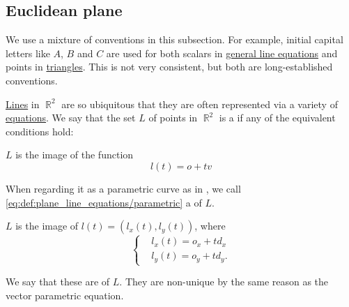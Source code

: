 \subsection{Euclidean plane}\label{subsec:euclidean_plane}

\begin{remark}\label{rem:geometry_mixed_conventions}
  We use a mixture of conventions in this subsection. For example, initial capital letters like \( A \), \( B \) and \( C \) are used for both scalars in \hyperref[def:plane_line_equations/general]{general line equations} and points in \hyperref[def:triangle]{triangles}. This is not very consistent, but both are long-established conventions.
\end{remark}

\begin{definition}\label{def:plane_line_equations}
  \hyperref[def:affine_line]{Lines} in \( \BbbR^2 \) are so ubiquitous that they are often represented via a variety of \hyperref[ex:equations]{equations}. We say that the set \( L \) of points in \( \BbbR^2 \) is a  if any of the equivalent conditions hold:

  \begin{thmenum}
     \( L \) is the image of the function
    \begin{equation}\label{eq:def:plane_line_equations/parametric}
      l(t) = o + tv
    \end{equation}

    When regarding it as a parametric curve as in , we call \eqref{eq:def:plane_line_equations/parametric} a  of \( L \).

     \( L \) is the image of \( l(t) = (l_x(t), l_y(t)) \), where
    \begin{equation}\label{eq:def:plane_line_equations/scalar_parametric}
      \begin{cases}
         &l_x(t) = o_x + t d_x  \\
         &l_y(t) = o_y + t d_y.
      \end{cases}
    \end{equation}

    We say that these are  of \( L \). They are non-unique by the same reason as the vector parametric equation.


\end{thmenum}
\end{definition}
